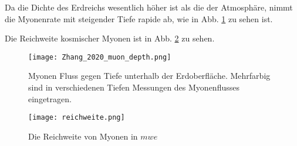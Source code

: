 Da die Dichte des Erdreichs wesentlich höher ist als die der Atmosphäre,
nimmt die Myonenrate mit steigender Tiefe rapide ab,
wie in Abb. \ref{fig:Tiefenrate} zu sehen ist.

Die Reichweite kosmischer Myonen ist in Abb. \ref{fig:reichweite} zu sehen.

\begin{figure}[h]
    \centering
    \texttt{[image: Zhang\_2020\_muon\_depth.png]}
    \caption{
        Myonen Fluss gegen Tiefe unterhalb der Erdoberfläche.
        Mehrfarbig sind in verschiedenen Tiefen Messungen des Myonenflusses eingetragen.
        \cite{zhang2020}}
    \label{fig:Tiefenrate}
\end{figure}

\begin{figure}[h]
    \centering
    \texttt{[image: reichweite.png]}
    \caption{
        Die Reichweite von Myonen in $mwe$
        \cite{Alexandrov2017}}
    \label{fig:reichweite}
\end{figure}